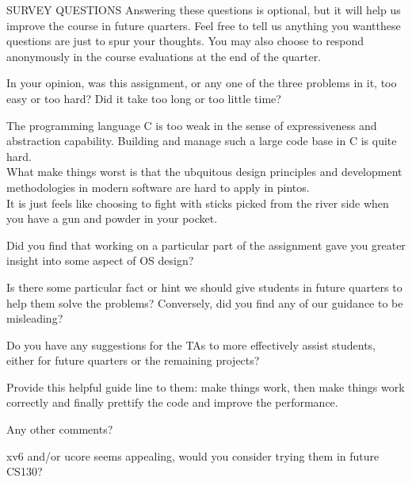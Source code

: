 \begin{aspect}{SURVEY QUESTIONS}
	Answering these questions is optional, but it will help us improve the course in future quarters.
	Feel free to tell us anything you wantthese questions are just to spur your thoughts.
	You may also choose to respond anonymously in the course evaluations at the end of the quarter.

	\begin{qc}
		\textbullet
		In your opinion, was this assignment, or any one of the three problems in it, too easy or too hard?
		Did it take too long or too little time?
	\end{qc}
	The programming language C is too weak in the sense of expressiveness and abstraction capability.
	Building and manage such a large code base in C is quite hard. \\
	What make things worst is that the ubquitous design principles and development methodologies in modern software are hard to apply in pintos.\\
	It is just feels like choosing to fight with sticks picked from the river side when you have a gun and powder in your pocket.

	\begin{qc}
		\textbullet
		Did you find that working on a particular part of the assignment gave you greater insight into some aspect of OS design?
	\end{qc}

	\begin{qc}
		\textbullet
		Is there some particular fact or hint we should give students in future quarters to help them solve the problems?
		Conversely, did you find any of our guidance to be misleading?
	\end{qc}

	\begin{qc}
		\textbullet
		Do you have any suggestions for the TAs to more effectively assist students,
		either for future quarters or the remaining projects?
	\end{qc}
	Provide this helpful guide line to them: make things work, then make things work correctly and finally prettify the code and improve the performance.

	\begin{qc}
		\textbullet
		Any other comments?
	\end{qc}
	xv6 and/or ucore seems appealing, would you consider trying them in future CS130?
\end{aspect}



